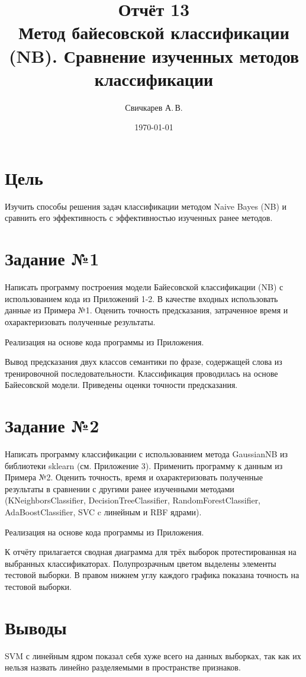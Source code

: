 \documentclass{article} %
\title{Отчёт 13\\
Метод байесовской классификации (NB).
Сравнение изученных методов классификации} %
\author{Свичкарев А.\,В.} %
\date{\today} %
\begin{document}

\maketitle %

\section{Цель}
Изучить способы решения задач классификации методом Naive
Bayes (NB) и сравнить его эффективность с эффективностью изученных ранее методов.

\section{Задание №1}
Написать программу построения
модели Байесовской классификации (NB)
с использованием кода из Приложений 1-2.
В качестве входных использовать данные
из Примера №1.
Оценить точность предсказания,
затраченное время и охарактеризовать
полученные результаты.

Реализация на основе кода программы из Приложения.
\bigskip

Вывод предсказания двух классов семантики
по фразе, содержащей слова из тренировочной последовательности.
Классификация проводилась на основе Байесовской модели.
Приведены оценки точности предсказания.


\clearpage
\section{Задание №2}
Написать программу классификации
с использованием метода GaussianNB
из библиотеки sklearn (см. Приложение 3).
Применить программу к данным из Примера №2.
Оценить точность, время
и охарактеризовать полученные результаты
в сравнении с другими ранее изученными методами
(KNeighborsClassifier, DecisionTreeClassifier,
RandomForestClassifier, AdaBoostClassifier,
SVC c линейным и RBF ядрами).

Реализация на основе кода программы из Приложения.

К отчёту прилагается сводная диаграмма
для трёх выборок
протестированная на выбранных классификаторах.
Полупрозрачным цветом выделены
элементы тестовой выборки.
В правом нижнем углу каждого графика
показана точность на тестовой выборки.

\section{Выводы}
SVM с линейным ядром показал себя хуже всего на данных выборках,
так как их нельзя назвать линейно разделяемыми в пространстве признаков.
\end{document}
